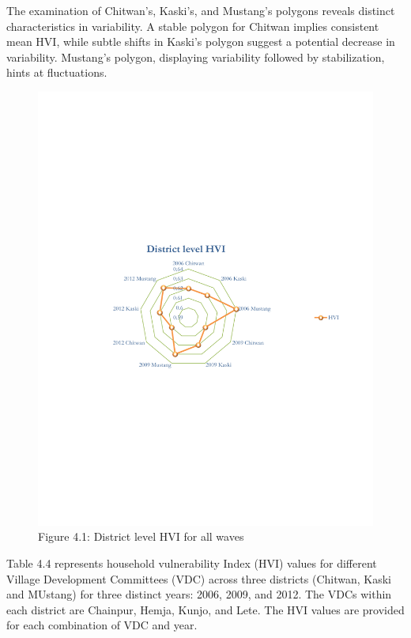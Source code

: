 The examination of Chitwan's, Kaski's, and Mustang's polygons reveals distinct characteristics in variability. A stable polygon for Chitwan implies consistent mean HVI, while subtle shifts in Kaski's polygon suggest a potential decrease in variability. Mustang's polygon, displaying variability followed by stabilization, hints at fluctuations.  
\begin{figure}[H]
	\vspace{-180pt} %
	\includegraphics[scale=0.8]{Graphs and figures/HVI_Summary_District_Panel.pdf}
	\captionsetup{labelformat=empty, aboveskip=1pt}%
	\vspace{-160pt}
	\caption{Figure 4.1: District level HVI for all waves} 
	\label{fig:distictlevelhvi}
	\setlength{\abovecaptionskip}{6pt}
	\label{fig:conceptualfw}
\end{figure}

Table 4.4 represents household vulnerability Index (HVI) values for different Village Development Committees (VDC) across three districts (Chitwan, Kaski and MUstang) for three distinct years: 2006, 2009, and 2012. The VDCs within each district are Chainpur, Hemja, Kunjo, and Lete. The HVI values are provided for each combination of VDC and year.

